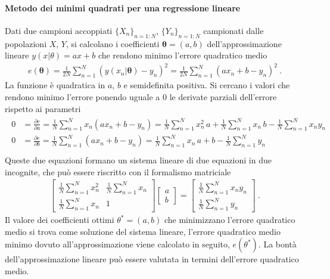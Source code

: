 \documentclass[letterpaper,10pt,italian]{jupyterBook}
\begin{document}
\paragraph{Metodo dei minimi quadrati per una regressione lineare}
\label{\detokenize{ch/statistics/hp-test-correlation:metodo-dei-minimi-quadrati-per-una-regressione-lineare}}
\sphinxAtStartPar
Dati due campioni accoppiati \(\{X_n\}_{n=1:N}\), \(\{Y_n\}_{n=1:N}\) campionati dalle popolazioni \(X\), \(Y\), si calcolano i coefficienti \(\symbf{\theta} = (a, b)\) dell’approssimazione lineare \(y(x|\theta) = a x + b\) che rendono minimo l’errore quadratico medio
\begin{equation*}
\begin{split}e(\symbf{\theta}) = \frac{1}{2 N} \sum_{n=1}^{N} (y(x_n|\symbf{\theta}) - y_n)^2 =  \frac{1}{2 N} \sum_{n=1}^{N} (a x_n + b - y_n)^2 \ .\end{split}
\end{equation*}
\sphinxAtStartPar
La funzione è quadratica in \(a\), \(b\) e semi\sphinxhyphen{}definita positiva. Si cercano i valori che rendono minimo l’errore ponendo uguale a \(0\) le derivate parziali dell’errore rispetto ai parametri
\begin{equation*}
\begin{split}\begin{aligned}
  0 & = \frac{\partial e}{\partial a} = \frac{1}{N} \sum_{n=1}^N x_n (a x_n + b - y_n) = \frac{1}{N} \sum_{n=1}^N x^2_n \, a + \frac{1}{N} \sum_{n=1}^N x_n \, b - \frac{1}{N} \sum_{n=1}^{N} x_n y_n \\
  0 & = \frac{\partial e}{\partial b} = \frac{1}{N} \sum_{n=1}^N (a x_n + b - y_n)     = \frac{1}{N} \sum_{n=1}^N x_n \, a + b - \frac{1}{N} \sum_{n=1}^{N} y_n \\
\end{aligned}\end{split}
\end{equation*}
\sphinxAtStartPar
Queste due equazioni formano un sistema lineare di due equazioni in due incognite, che può essere riscritto con il formalismo matriciale
\begin{equation*}
\begin{split}\begin{bmatrix} \frac{1}{N} \sum_{n=1}^N x^2_n & \frac{1}{N} \sum_{n=1}^N x_n  \\ \frac{1}{N} \sum_{n=1}^N x_n & 1 \end{bmatrix} \begin{bmatrix} a \\ b \end{bmatrix} = \begin{bmatrix} \frac{1}{N} \sum_{n=1}^{N} x_n y_n \\ \frac{1}{N} \sum_{n=1}^{N} y_n \end{bmatrix} \ .\end{split}
\end{equation*}
\sphinxAtStartPar
Il valore dei coefficienti ottimi \(\theta^* = (a, b)\) che minimizzano l’errore quadratico medio si trova come soluzione del sistema lineare, l’errore quadratico medio minimo dovuto all’approssimazione viene calcolato in seguito, \(e(\theta^*)\). La bontà dell’approssimazione lineare può essere valutata in termini dell’errore quadratico medio.
\end{document}
